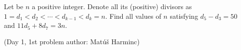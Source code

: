Let be $n$ a positive integer. Denote all its (positive) divisors as $1=d_1<d_2<\cdots<d_{k-1}<d_k=n$.
Find all values of $n$ satisfying $d_5-d_3=50$ and $11d_5+8d_7=3n$.

(Day 1, 1st problem
author: Matúš Harminc)